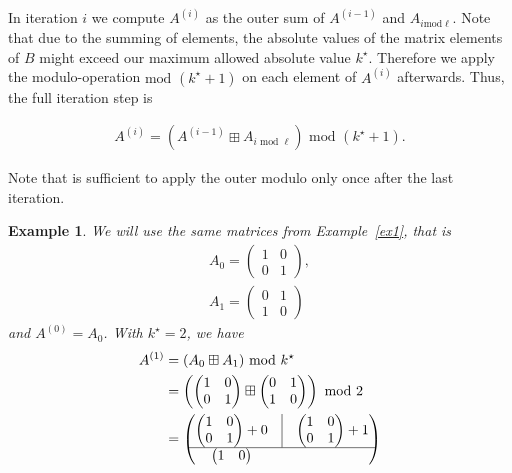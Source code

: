 \documentclass[a4paper,11pt]{article}
\theoremstyle{mystyle}
\newtheorem{exmp}{Example}
\newcommand{\exref}[1]{Example~\ref{#1}}
\begin{document}
In iteration $i$ we compute $A^{(i)}$ as the outer sum of $A^{(i-1)}$ and $A_{i \text{mod} \ell}$. 
Note that due to the summing of elements, the absolute values of the matrix elements of $B$ might exceed our maximum allowed absolute value $k^\star$.
Therefore we apply the modulo-operation $\text{mod } (k^\star +1)$ on each element of $A^{(i)}$ afterwards. Thus, the full iteration step is

\begin{align*}
A^{(i)} = (A^{(i-1)} \boxplus A_{i \text{ mod } \ell}) \text{ mod } (k^\star +1).
\end{align*}

Note that is sufficient to apply the outer modulo only once after the last iteration.

\begin{exmp}
We will use the same matrices from \exref{ex1}, that is 
\begin{align*}
A_0 = \begin{pmatrix}
1 & 0\\
0 & 1
\end{pmatrix},\\
A_1 = \begin{pmatrix}
0 & 1\\
1 & 0
\end{pmatrix}
\end{align*}
and $A^{(0)} = A_0$. With $k^\star=2$, we have
\begin{align*}
A^{(1)} & = (A_0 \boxplus A_1) \text{ mod }k^\star \\
&= \left(\begin{pmatrix}
1 & 0\\
0 & 1
\end{pmatrix} \boxplus \begin{pmatrix}
0 & 1\\
1 & 0
\end{pmatrix}\right) \text{ mod }2 \\
& = \begin{pmatrix}
\begin{pmatrix}
1 & 0\\
0 & 1
\end{pmatrix} + 0 & \vline & \begin{pmatrix}
1 & 0\\
0 & 1
\end{pmatrix} + 1 \\ \hline
\begin{pmatrix}
1 & 0\\

\end{pmatrix}
\end{pmatrix}
\end{align*}
\end{exmp}
\end{document}
